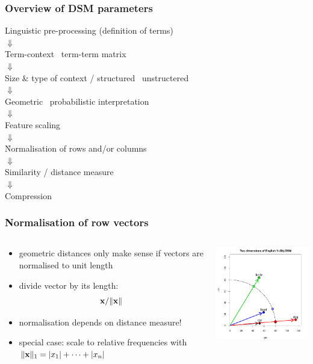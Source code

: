 \begin{frame}
  \frametitle{Overview of DSM parameters}

  \ungap[1]
  \begin{center}
    Linguistic pre-processing (definition of terms)\\
    $\Downarrow$\\
    Term-context \vs\ term-term matrix\\
    $\Downarrow$\\
    Size \& type of context / structured \vs\ unstructered\\
    $\Downarrow$\\
    Geometric \vs\ probabilistic interpretation\\
    $\Downarrow$\\
    Feature scaling\\
    $\Downarrow$\\
    \h{Normalisation of rows and/or columns}\\
    $\Downarrow$\\
    Similarity / distance measure\\
    $\Downarrow$\\
    Compression
  \end{center}
\end{frame}

\begin{frame}[c]
  \frametitle{Normalisation of row vectors}
  
  \begin{columns}[c]
    \begin{column}{5cm}
      \begin{itemize}
      \item geometric distances only make sense if vectors are normalised to unit length
      \item divide vector by its length: \[ \vx / \norm{\vx} \]
      \item normalisation depends on distance measure!
      \item special case: scale to relative frequencies with
        $\norm[1]{\vx} = \abs{x_1} + \dots + \abs{x_n}$
      \end{itemize}
    \end{column}
    \begin{column}{6cm}
      \includegraphics[width=6cm]{img/hieroglyph_2d_4}
    \end{column}
  \end{columns}
\end{frame}

